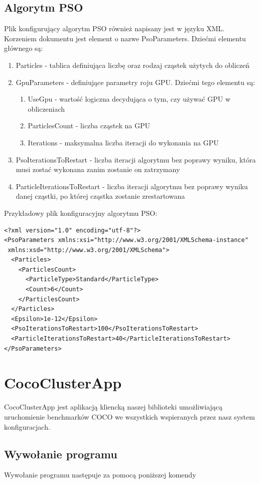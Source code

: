 \documentclass[12pt, twoside, openany, abstract=on]{report}
\theoremstyle{definition}
\begin{document}
\subsection{Algorytm PSO}
Plik konfigurujący algorytm PSO również napisany jest w języku XML. Korzeniem dokumentu jest element o nazwe PsoParameters. 
Dziećmi elementu głównego są:
\begin{enumerate}
	\item Particles - tablica definiująca liczbę oraz rodzaj cząstek użytych do obliczeń
	\item GpuParameters - definiujące parametry roju GPU. Dziećmi tego elementu są:
	\begin{enumerate}
		\item UseGpu - wartość logiczna decydująca o tym, czy używać GPU w obliczeniach
		\item ParticlesCount - liczba cząstek na GPU
		\item Iterations - maksymalna liczba iteracji do wykonania na GPU
	\end{enumerate}
	\item PsoIterationsToRestart - liczba iteracji algorytmu bez poprawy wyniku, która musi zostać wykonana zanim zostanie on zatrzymany
	\item ParticleIterationsToRestart - liczba iteracji algorytmu bez poprawy wyniku danej cząstki, po której cząstka zostanie zrestartowana

\end{enumerate}
\clearpage
Przykładowy plik konfiguracyjny algorytmu PSO:
\lstset{language=XML}
\begin{lstlisting}[frame=single]
<?xml version="1.0" encoding="utf-8"?>
<PsoParameters xmlns:xsi="http://www.w3.org/2001/XMLSchema-instance"
 xmlns:xsd="http://www.w3.org/2001/XMLSchema">
  <Particles>
    <ParticlesCount>
      <ParticleType>Standard</ParticleType>
      <Count>6</Count>
    </ParticlesCount>
  </Particles>
  <Epsilon>1e-12</Epsilon>
  <PsoIterationsToRestart>100</PsoIterationsToRestart>
  <ParticleIterationsToRestart>40</ParticleIterationsToRestart>
</PsoParameters>
\end{lstlisting}
\section{CocoClusterApp}
CocoClusterApp jest aplikacją kliencką naszej biblioteki umożliwiającą uruchomienie benchmarków COCO we wszystkich wspieranych przez nasz system konfiguracjach.

\subsection{Wywołanie programu}
  Wywołanie programu następuje za pomocą poniższej komendy
\end{document}
